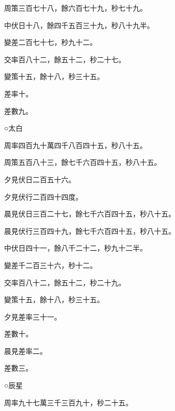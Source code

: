 \begin{pinyinscope}
 周策三百七十八，餘六百七十九，秒七十九。



 中伏日十八，餘四千五百三十九，秒八十九半。



 變差二百七十七，秒九十二。



 交率百八十二，餘五十二，秒二十七。



 變策十五，餘十八，秒三十五。



 差率十。



 差數九。



 ○太白



 周率四百九十萬四千八百四十五，秒八十五。



 周策五百八十三，餘七千六百四十五，秒八十五。



 夕見伏日二百五十六。



 夕見伏行二百四十四度。



 晨見伏日三百二十七，餘七千六百四十五，秒八十五。



 晨見伏行三百四十九，餘七千六百四十五，秒八十五。



 中伏日四十一，餘八千二十二，秒九十二半。



 變差千二百三十六，秒十二。



 交率百八十二，餘五十二，秒二十九。



 變策十五，餘十八，秒三十五。



 夕見差率三十一。



 差數十。



 晨見差率二。



 差數三。



 ○辰星



 周率九十七萬三千三百九十，秒二十五。




\end{pinyinscope}
